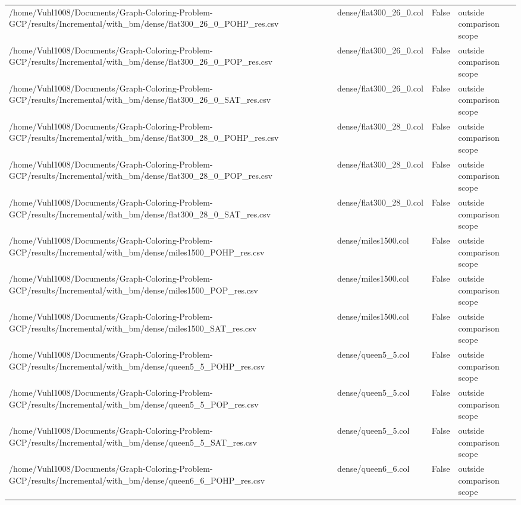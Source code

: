 \begin{table}[htbp]
\begin{tabular}{llll}
/home/Vuhl1008/Documents/Graph-Coloring-Problem-GCP/results/Incremental/with\_bm/dense/flat300\_26\_0\_POHP\_res.csv & dense/flat300\_26\_0.col & False & outside comparison scope \\
/home/Vuhl1008/Documents/Graph-Coloring-Problem-GCP/results/Incremental/with\_bm/dense/flat300\_26\_0\_POP\_res.csv & dense/flat300\_26\_0.col & False & outside comparison scope \\
/home/Vuhl1008/Documents/Graph-Coloring-Problem-GCP/results/Incremental/with\_bm/dense/flat300\_26\_0\_SAT\_res.csv & dense/flat300\_26\_0.col & False & outside comparison scope \\
/home/Vuhl1008/Documents/Graph-Coloring-Problem-GCP/results/Incremental/with\_bm/dense/flat300\_28\_0\_POHP\_res.csv & dense/flat300\_28\_0.col & False & outside comparison scope \\
/home/Vuhl1008/Documents/Graph-Coloring-Problem-GCP/results/Incremental/with\_bm/dense/flat300\_28\_0\_POP\_res.csv & dense/flat300\_28\_0.col & False & outside comparison scope \\
/home/Vuhl1008/Documents/Graph-Coloring-Problem-GCP/results/Incremental/with\_bm/dense/flat300\_28\_0\_SAT\_res.csv & dense/flat300\_28\_0.col & False & outside comparison scope \\
/home/Vuhl1008/Documents/Graph-Coloring-Problem-GCP/results/Incremental/with\_bm/dense/miles1500\_POHP\_res.csv & dense/miles1500.col & False & outside comparison scope \\
/home/Vuhl1008/Documents/Graph-Coloring-Problem-GCP/results/Incremental/with\_bm/dense/miles1500\_POP\_res.csv & dense/miles1500.col & False & outside comparison scope \\
/home/Vuhl1008/Documents/Graph-Coloring-Problem-GCP/results/Incremental/with\_bm/dense/miles1500\_SAT\_res.csv & dense/miles1500.col & False & outside comparison scope \\
/home/Vuhl1008/Documents/Graph-Coloring-Problem-GCP/results/Incremental/with\_bm/dense/queen5\_5\_POHP\_res.csv & dense/queen5\_5.col & False & outside comparison scope \\
/home/Vuhl1008/Documents/Graph-Coloring-Problem-GCP/results/Incremental/with\_bm/dense/queen5\_5\_POP\_res.csv & dense/queen5\_5.col & False & outside comparison scope \\
/home/Vuhl1008/Documents/Graph-Coloring-Problem-GCP/results/Incremental/with\_bm/dense/queen5\_5\_SAT\_res.csv & dense/queen5\_5.col & False & outside comparison scope \\
/home/Vuhl1008/Documents/Graph-Coloring-Problem-GCP/results/Incremental/with\_bm/dense/queen6\_6\_POHP\_res.csv & dense/queen6\_6.col & False & outside comparison scope \\

\end{tabular}
\end{table}
